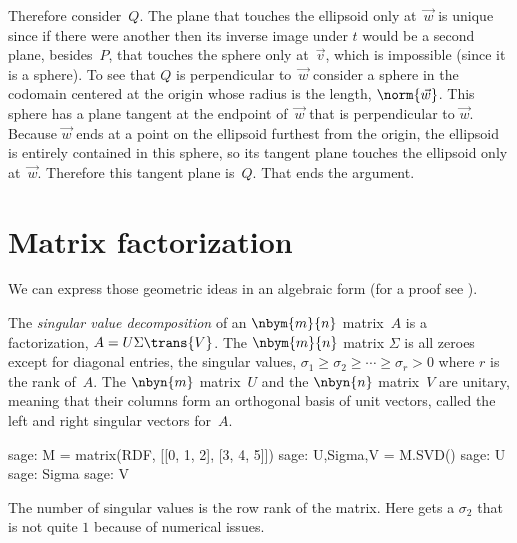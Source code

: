Therefore consider~$Q$.
The plane that touches the ellipsoid
only at~$\vec{w}$ is unique since if there were another then its inverse image
under $t$
would be a second plane, besides~$P$, 
that touches the sphere only at~$\vec{v}$, which is impossible (since it is a
sphere).
To see that $Q$ is perpendicular to~$\vec{w}$ consider a sphere in the codomain
centered at the origin whose radius is the length, $\norm{\vec{w}}$.
This sphere has a plane tangent at the endpoint of~$\vec{w}$ 
that is perpendicular
to $\vec{w}$.
Because $\vec{w}$ ends at a point on the ellipsoid furthest from the origin,
the ellipsoid is entirely contained in this sphere, so its tangent plane 
touches the ellipsoid only at~$\vec{w}$.
Therefore
this tangent plane is~$Q$. 
That ends the argument.



\section{Matrix factorization}

We can express those geometric ideas in an algebraic form
(for a proof see \cite{TrefethenBau97}).

The \textit{singular value decomposition} of an $\nbym{m}{n}$ matrix~$A$
is a factorization, $A=U\Sigma \trans{V}$\!.
The $\nbym{m}{n}$ matrix $\Sigma$ 
is all zeroes except for diagonal entries, the singular values, 
$\sigma_1\geq \sigma_2 \geq \cdots \geq \sigma_r> 0$ where $r$ is the
rank of~$A$.
The $\nbyn{m}$ matrix~$U$ and the $\nbyn{n}$ matrix~$V$ are unitary, meaning
that their columns form an orthogonal basis of unit vectors, called 
the left and 
right singular vectors for~$A$. 
\begin{sagecommandline}
sage: M = matrix(RDF, [[0, 1, 2], [3, 4, 5]])
sage: U,Sigma,V = M.SVD()
sage: U
sage: Sigma
sage: V  
\end{sagecommandline}
The number of singular values is the row rank of the matrix.
Here \Sage{} gets a $\sigma_2$ that is not quite \( 1 \) because of numerical 
issues. 

